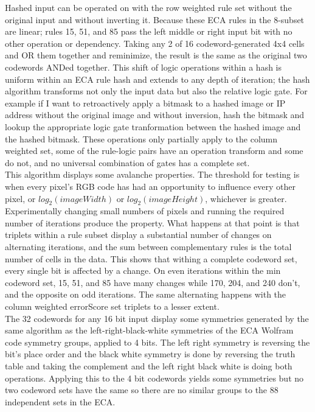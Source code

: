 \documentclass[11pt]{article}
\begin{document}
Hashed input can be operated on with the row weighted rule set without the original input and without inverting it. Because these ECA rules in the 8-subset are linear; rules 15, 51, and 85 pass the left middle or right input bit with no other operation or dependency. Taking any 2 of 16 codeword-generated 4x4 cells and OR them together and reminimize, the result is the same as the original two codewords ANDed together.  This shift of logic operations within a hash is uniform within an ECA rule hash and extends to any depth of iteration; the hash algorithm transforms not only the input data but also the relative logic gate. For example if I want to retroactively apply a bitmask to a hashed image or IP address without the original image and without inversion, hash the bitmask and lookup the appropriate logic gate tranformation between the hashed image and the hashed bitmask. These operations only partially apply to the column weighted set, some of the rule-logic pairs have an operation transform and some do not, and no universal combination of gates has a complete set. \\

This algorithm displays some avalanche properties. The threshold for testing is when every pixel's RGB code has had an opportunity to influence every other pixel, or $log_2(imageWidth)$ or $log_2(imageHeight)$, whichever is greater. Experimentally changing small numbers of pixels and running the required number of iterations produce the property. What happens at that point is that triplets within a rule subset display a substantial number of changes on alternating iterations, and the sum between complementary rules is the total number of cells in the data. This shows that withing a complete codeword set, every single bit is affected by a change. On even iterations within the min codeword set, 15, 51, and 85 have many changes while 170, 204, and 240 don't, and the opposite on odd iterations. The same alternating happens with the column weighted errorScore set triplets to a lesser extent.\\

The 32 codewords for any 16 bit input display some symmetries generated by the same algorithm as the left-right-black-white symmetries of the ECA Wolfram code symmetry groups, applied to 4 bits. The left right symmetry is reversing the bit's place order and the black white symmetry is done by reversing the truth table and taking the complement and the left right black white is doing both operations. Applying this to the 4 bit codewords yields some symmetries but no two codeword sets have the same so there are no similar groups to the 88 independent sets in the ECA.\cite{Wolfram}\\
\end{document}
